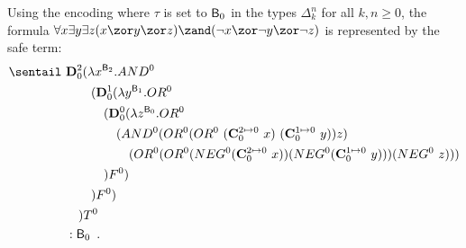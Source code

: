 %
\begin{example}
Using the encoding where $\tau$ is set to  $\mathsf{B}_0$ in the types $\Delta_k^n$ for all $k,n\geq 0$, the formula $\forall x \exists y \exists z (x\zor y\zor z)\zand(\neg x\zor \neg y\zor \neg z)$ is represented by the safe term:
\begin{align*}
\sentail~&\mathbf{D}_0^2(\lambda x^{\booltype_2}. AND^0\\
&\quad\quad (\mathbf{D}_0^1(\lambda y^{\booltype_1}.OR^0\\
&\quad\quad\quad (\mathbf{D}_0^0(\lambda z^{\booltype_0}.OR^0\\
&\quad\quad\quad\quad (AND^0 (OR^0(OR^0~(\mathbf{C}_0^{2\mapsto 0}~x)~(\mathbf{C}_0^{1\mapsto 0}~y))z) \\
&\quad\quad\quad\quad\quad (OR^0(OR^0(NEG^0 (\mathbf{C}_0^{2\mapsto 0}~x))(NEG^0 (\mathbf{C}_0^{1\mapsto 0}~y)))(NEG^0~z))) \\
&\quad\quad\quad )F^0)\\
&\quad\quad)F^0)\\
&\quad) T^0 \\
& : \booltype_0 \enspace .
\end{align*}
\end{example}


